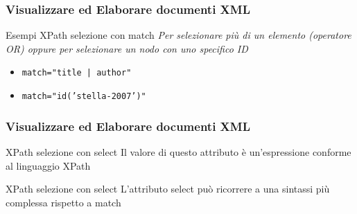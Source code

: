 \begin{frame}
    \frametitle{Visualizzare ed Elaborare documenti XML}
    \addtocounter{nframe}{1}
    

    \begin{block}{Esempi XPath selezione con match}
        \emph{Per selezionare più di un elemento (operatore OR) oppure per selezionare un nodo con uno specifico ID}
        \begin{itemize}
            \item \texttt{match="title | author"}
            \item \texttt{match="id('stella-2007')"}
        \end{itemize}
        
    \end{block}
    
\end{frame}


\begin{frame}
    \frametitle{Visualizzare ed Elaborare documenti XML}
    \addtocounter{nframe}{1}
    

    \begin{block}{XPath selezione con select}
        Il valore di questo attributo è un'espressione conforme al linguaggio XPath
    \end{block}

    \begin{block}{XPath selezione con select}
        L'attributo select può ricorrere a una sintassi più complessa rispetto a match
    \end{block}
    
\end{frame}


